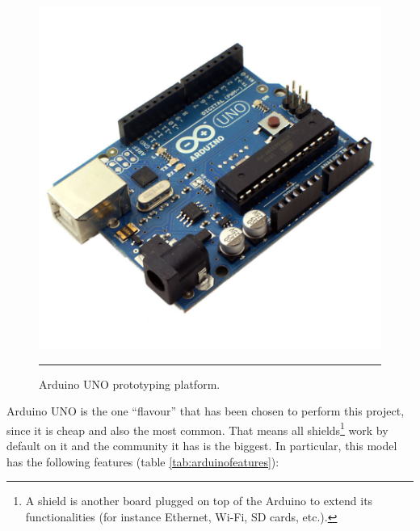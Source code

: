 \begin{figure}[htbp]
    \centering
    \includegraphics[scale=0.2]{./Figures/auno.jpg}
        \rule{35em}{0.5pt}
        \caption[Arduino UNO]{Arduino UNO prototyping platform.}
    \label{fig:ArduinoUNO}
\end{figure}

Arduino UNO is the one ``flavour'' that has been chosen to perform this project, since it is cheap and also the most common. That means all shields\footnote{A shield is another board plugged on top of the Arduino to extend its functionalities (for instance Ethernet, Wi-Fi, SD cards, etc.).}  work by default on it and the community it has is the biggest. In particular, this model has the following features (table \ref{tab:arduinofeatures}):
\\

